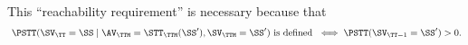 \begin{note}
  \def\quant{\PSTT(\SV_\TT = \SS \mid \AV_\TTM = \STT_\TTM(\SS'), \SV_\TTM = \SS')}
  This ``reachability requirement'' is necessary
  because 
  that
  $$\text{ $\quant$ is defined } 
  \iff \PSTT(\SV_{\TT - 1} = \SS') > 0.$$%
\end{note}

